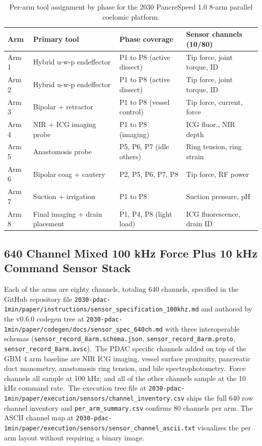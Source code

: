 \begin{table}[H]
\caption{Per-arm tool assignment by phase for the 2030 PancreSpeed 1.0 8-arm parallel coelomic platform.}
\label{tab:methods-pancrespeed}
\centering
\begin{tabular}{>{\raggedright\arraybackslash}p{1.2cm} >{\raggedright\arraybackslash}p{4.5cm} >{\raggedright\arraybackslash}p{4.1cm} >{\raggedright\arraybackslash}p{4.7cm}}
\toprule
\textbf{Arm} & \textbf{Primary tool} & \textbf{Phase coverage} & \textbf{Sensor channels (10/80)} \\
\midrule
  Arm 1 & Hybrid u-w-p endeffector & P1 to P8 (active dissect) & Tip force, joint torque, ID \\
  Arm 2 & Hybrid u-w-p endeffector & P1 to P8 (active dissect) & Tip force, joint torque, ID \\
  Arm 3 & Bipolar + retractor & P1 to P8 (vessel control) & Tip force, current, force \\
  Arm 4 & NIR + ICG imaging probe & P1 to P8 (imaging) & ICG fluor., NIR depth \\
  Arm 5 & Anastomosis probe & P5, P6, P7 (idle others) & Ring tension, ring strain \\
  Arm 6 & Bipolar coag + cautery & P2, P5, P6, P7, P8 & Tip force, RF power \\
  Arm 7 & Suction + irrigation & P1 to P8 & Suction pressure, pH \\
  Arm 8 & Final imaging + drain placement & P1, P4, P8 (light load) & ICG fluorescence, drain ID \\
\bottomrule
\end{tabular}
\end{table}

\subsection{640 Channel Mixed 100 kHz Force Plus 10 kHz Command Sensor Stack}
\label{sec:methods-sensors}

Each of the arms are eighty channels, totaling 640 channels, specified
in the GitHub repository file
\texttt{2030-pdac-1min/paper/instructions/sensor_specification_100khz.md}
and authored by the v0.6.0 codegen tree at
\texttt{2030-pdac-1min/paper/codegen/docs/sensor_spec_640ch.md}
with three interoperable schemas
(\texttt{sensor_record_8arm.schema.json},
\texttt{sensor_record_8arm.proto},
\texttt{sensor_record_8arm.avsc}).\ The PDAC specific channels added
on top of the GBM 4 arm baseline are NIR ICG imaging, vessel
surface proximity, pancreatic duct manometry, anastomosis ring
tension, and bile spectrophotometry.\ Force channels all sample at 100
kHz; and all of the other channels sample at the 10 kHz command rate.\ The execution tree file at
\texttt{2030-pdac-1min/paper/execution/sensors/channel_inventory.csv}
ships the full 640 row channel inventory and
\texttt{per_arm_summary.csv} confirms 80 channels per arm. The
ASCII channel map at
\texttt{2030-pdac-1min/paper/execution/sensors/sensor_channel_ascii.txt}
visualizes the per arm layout without requiring a binary image.

